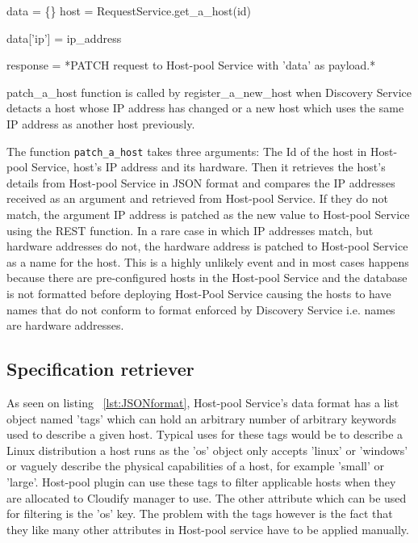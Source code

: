 \begin{center}
\begin{algorithm}[H]
\label{fig:patch}
\setlength{\AlCapSkip}{1em}
\begin{center}
\end{center}

data = \{\}\;
host = RequestService.get\_a\_host(id)\;

 {
	data['ip'] = ip\_address\;
} 

response = *PATCH request to Host-pool Service with 'data' as payload.*\;

\caption{patch\_a\_host function is called by register\_a\_new\_host when Discovery Service detacts a host whose IP address has changed or a new host which uses the same IP address as another host previously.}

\end{algorithm}
\end{center}

The function \verb|patch_a_host| takes three arguments: The Id of the host in Host-pool Service, host's IP address and its hardware. Then it retrieves the host's details from Host-pool Service in JSON format and compares the IP addresses received as an argument and retrieved from Host-pool Service. If they do not match, the argument IP address is patched as the new value to Host-pool Service using the REST function. In a rare case in which IP addresses match, but hardware addresses do not, the hardware address is patched to Host-pool Service as a name for the host. This is a highly unlikely event and in most cases happens because there are pre-configured hosts in the Host-pool Service and the database is not formatted before deploying Host-Pool Service causing the hosts to have names that do not conform to format enforced by Discovery Service i.e. names are hardware addresses.

\subsection{Specification retriever} \label{specification_retriever}

As seen on listing ~\ref{lst:JSONformat}, Host-pool Service's data format has a list object named 'tags' which can hold an arbitrary number of arbitrary keywords used to describe a given host. Typical uses for these tags would be to describe a Linux distribution a host runs as the 'os' object only accepts 'linux' or 'windows' or vaguely describe the physical capabilities of a host, for example 'small' or 'large'. Host-pool plugin can use these tags to filter applicable hosts when they are allocated to Cloudify manager to use. The other attribute which can be used for filtering is the 'os' key. The problem with the tags however is the fact that they like many other attributes in Host-pool service have to be applied manually.

